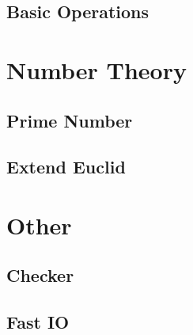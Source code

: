 \documentclass[twoside]{article}
\begin{document}
		\subsection{Basic Operations}
			
	\newpage
	\section{Number Theory}
		\subsection{Prime Number}
			
		\subsection{Extend Euclid}
			
	\newpage
	\section{Other}
		\subsection{Checker}
			
		\subsection{Fast IO}
			
\end{document}
